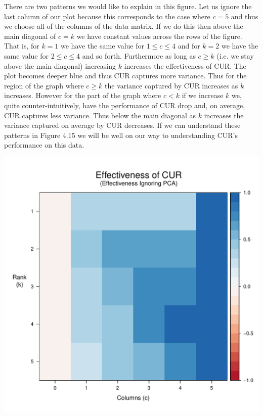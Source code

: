\documentclass{book}
\begin{document}
There are two patterns we would like to explain in this figure. Let us ignore the last column of our plot because this corresponds to the case where $c=5$ and thus we choose all of the columns of the data matrix. If we do this then above the main diagonal of $c=k$ we have constant values across the rows of the figure. That is, for $k=1$ we have the same value for $1\leq c \leq 4$ and for $k=2$ we have the same value for $2 \leq c \leq 4$ and so forth. Furthermore as long as $c \geq k$ (i.e. we stay above the main diagonal) increasing $k$ increases the effectiveness of CUR. The plot becomes deeper blue and thus CUR captures more variance. Thus for the region of the graph where $c \geq k$ the variance captured by CUR increases as $k$ increases. However for the part of the graph where $c<k$ if we increase $k$ we, quite counter-intuitively, have the performance of CUR drop and, on average, CUR captures less variance. Thus below the main diagonal as $k$ increases the variance captured on average by CUR decreases. If we can understand these patterns in Figure 4.15 we will be well on our way to understanding CUR's performance on this data. 

\begin{center}
\includegraphics[scale=.63]{./Figures/diag_ex_2/raster_cur.pdf}%
\end{center}
\end{document}
